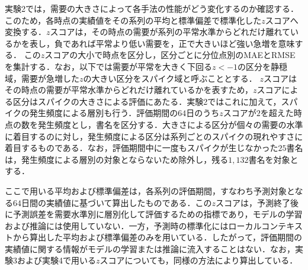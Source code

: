 \documentclass[twocolumn, lastpage]{jarticle}
\newif\ifrevmark
\newcommand{\revA}[1]{\ifrevmark{\color{blue}#1}\else#1\fi}
\newcommand{\revB}[1]{\ifrevmark{\color{red}#1}\else#1\fi}
\begin{document}
実験2では，需要の大きさによって各手法の性能がどう変化するのか確認する．このため，各時点の実績値をその系列の平均と標準偏差で標準化した$z$スコアへ変換する．$z$スコアは，その時点の需要が系列の平常水準からどれだけ離れているかを表し，負であれば平常より低い需要を，正で大きいほど強い急増を意味する．
この$z$スコアの大小で時点を区分し，区分ごとに分位点別のMAEとRMSEを集計する．なお，以下では需要が平常を大きく下回る$z<-1$の区分を静穏域，需要が急増した$z$の大きい区分をスパイク域と呼ぶこととする．
\revA{$z$スコアはその時点の需要が平常水準からどれだけ離れているかを表すため，$z$スコアによる区分はスパイクの大きさによる評価にあたる．実験2ではこれに加えて，スパイクの発生頻度による層別も行う．評価期間の$64$日のうち$z$スコアが$2$を超えた時点の数を発生頻度とし，書名を区分する．大きさによる区分が個々の需要の水準に着目するのに対し，発生頻度による区分は系列ごとのスパイクの現れやすさに着目するものである．なお，評価期間中に一度もスパイクが生じなかった$25$書名は，発生頻度による層別の対象とならないため除外し，残る$1{,}132$書名を対象とする．}

\revB{ここで用いる平均および標準偏差は，各系列の評価期間，すなわち予測対象となる$64$日間の実績値に基づいて算出したものである．この$z$スコアは，予測終了後に予測誤差を需要水準別に層別化して評価するための指標であり，モデルの学習および推論には使用していない．一方，予測時の標準化にはローカルコンテキストから算出した平均および標準偏差のみを用いている．したがって，評価期間の実績値に関する情報がモデルの学習または推論に流入することはない．なお，実験3および実験4で用いる$z$スコアについても，同様の方法により算出している．}
\end{document}
